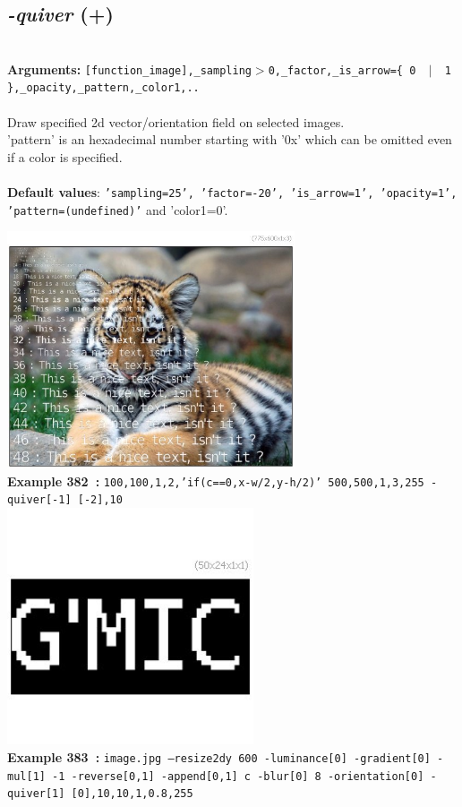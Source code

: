 \documentclass[a4paper,11pt,twoside]{book}
\begin{document}
\subsection{\emph{-quiver} (+)}\vspace*{-0.5em}
~\\\textbf{Arguments: } 
{\small \texttt{[function\_image],\_sampling$>$0,\_factor,\_is\_arrow=\{ 0 ~$|$~ 1 \},\_opacity,\_pattern,\_color1,..}}\\~\\
Draw specified 2d vector/orientation field on selected images.
~\\'pattern' is an hexadecimal number starting with '0x' which can be omitted
even if a color is specified.
~\\~\\\textbf{Default values}: {\small \texttt{'sampling=25', 'factor=-20', 'is\_arrow=1', 'opacity=1', 'pattern=(undefined)'}}
and 'color1=0'.
\begin{center}\includegraphics[keepaspectratio=true,height=7cm,width=\textwidth]{img/gmic_def382.jpg}\\
{\footnotesize \textbf{Example 382~:} \texttt{100,100,1,2,'if(c==0,x-w/2,y-h/2)' 500,500,1,3,255 -quiver[-1] [-2],10}}
\\\includegraphics[keepaspectratio=true,height=7cm,width=\textwidth]{img/gmic_def383.jpg}\\
{\footnotesize \textbf{Example 383~:} \texttt{image.jpg --resize2dy 600 -luminance[0] -gradient[0] -mul[1] -1 -reverse[0,1] -append[0,1] c -blur[0] 8 -orientation[0] -quiver[1] [0],10,10,1,0.8,255}}
\end{center}
\end{document}
